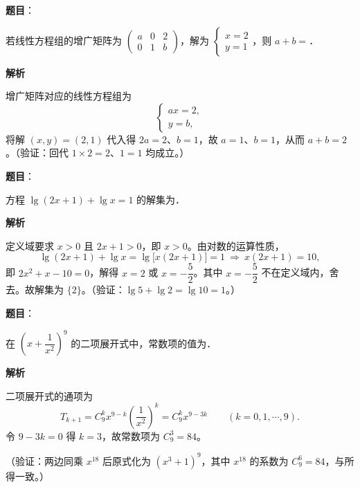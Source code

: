 \begin{answer}

\textbf{题目}：

若线性方程组的增广矩阵为 $\begin{pmatrix} a & 0 & 2\\ 0 & 1 & b \end{pmatrix}$，解为 $\begin{cases} x=2\\ y=1 \end{cases}$，则 \(a+b=\)\gkblank{}．

\textbf{解析}

增广矩阵对应的线性方程组为
\nopagebreak[4]
\[
\begin{cases}
ax=2,\\
y=b,
\end{cases}
\]
将解 \((x,y)=(2,1)\) 代入得 \(2a=2\)、\(b=1\)，故 \(a=1\)、\(b=1\)，从而 \(a+b=2\)。（验证：回代 \(1\times2=2\)、\(1=1\) 均成立。）


\end{answer}
\begin{answer}

\textbf{题目}：

方程 \(\lg(2x+1)+\lg x=1\) 的解集为\gkblank{}．

\textbf{解析}

定义域要求 \(x>0\) 且 \(2x+1>0\)，即 \(x>0\)。由对数的运算性质，
\nopagebreak[4]
\[
\lg(2x+1)+\lg x=\lg\bigl[x(2x+1)\bigr]=1\ \Longrightarrow\ x(2x+1)=10,
\]
即 \(2x^{2}+x-10=0\)，解得 \(x=2\) 或 \(x=-\dfrac{5}{2}\)。其中 \(x=-\dfrac{5}{2}\) 不在定义域内，舍去。故解集为 \(\{2\}\)。（验证：\(\lg 5+\lg 2=\lg 10=1\)。）


\end{answer}
\begin{answer}

\textbf{题目}：

在 \(\left(x+\dfrac{1}{x^{2}}\right)^{9}\) 的二项展开式中，常数项的值为\gkblank{}．

\textbf{解析}

二项展开式的通项为
\nopagebreak[4]
\[
T_{k+1}=C_{9}^{k}x^{9-k}\left(\frac{1}{x^{2}}\right)^{k}=C_{9}^{k}x^{9-3k}\qquad(k=0,1,\cdots,9).
\]
令 \(9-3k=0\) 得 \(k=3\)，故常数项为 \(C_{9}^{3}=84\)。

（验证：两边同乘 \(x^{18}\) 后原式化为 \((x^{3}+1)^{9}\)，其中 \(x^{18}\) 的系数为 \(C_{9}^{6}=84\)，与所得一致。）


\end{answer}
